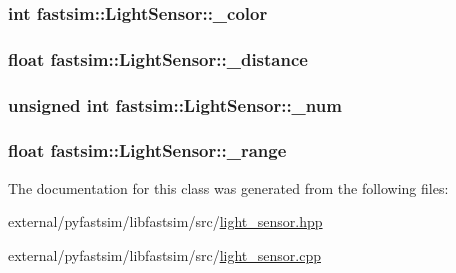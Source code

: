 \subsubsection[{\texorpdfstring{\+\_\+color}{_color}}]{\setlength{\rightskip}{0pt plus 5cm}int fastsim\+::\+Light\+Sensor\+::\+\_\+color\hspace{0.3cm}{\ttfamily [protected]}}\hypertarget{classfastsim_1_1_light_sensor_a25bf9d5e09196f8f7bcbc5069227c794}{}\label{classfastsim_1_1_light_sensor_a25bf9d5e09196f8f7bcbc5069227c794}
\subsubsection[{\texorpdfstring{\+\_\+distance}{_distance}}]{\setlength{\rightskip}{0pt plus 5cm}float fastsim\+::\+Light\+Sensor\+::\+\_\+distance\hspace{0.3cm}{\ttfamily [protected]}}\hypertarget{classfastsim_1_1_light_sensor_a620752a7c31d64be5b8890015411c9ba}{}\label{classfastsim_1_1_light_sensor_a620752a7c31d64be5b8890015411c9ba}
\subsubsection[{\texorpdfstring{\+\_\+num}{_num}}]{\setlength{\rightskip}{0pt plus 5cm}unsigned int fastsim\+::\+Light\+Sensor\+::\+\_\+num\hspace{0.3cm}{\ttfamily [protected]}}\hypertarget{classfastsim_1_1_light_sensor_a5bc0eb8041ebecc0834202d1472bc078}{}\label{classfastsim_1_1_light_sensor_a5bc0eb8041ebecc0834202d1472bc078}
\subsubsection[{\texorpdfstring{\+\_\+range}{_range}}]{\setlength{\rightskip}{0pt plus 5cm}float fastsim\+::\+Light\+Sensor\+::\+\_\+range\hspace{0.3cm}{\ttfamily [protected]}}\hypertarget{classfastsim_1_1_light_sensor_aaf45fbb76a0604bf6f982795d6a48286}{}\label{classfastsim_1_1_light_sensor_aaf45fbb76a0604bf6f982795d6a48286}


The documentation for this class was generated from the following files\+:\begin{DoxyCompactItemize}
\item 
external/pyfastsim/libfastsim/src/\hyperlink{light__sensor_8hpp}{light\+\_\+sensor.\+hpp}\item 
external/pyfastsim/libfastsim/src/\hyperlink{light__sensor_8cpp}{light\+\_\+sensor.\+cpp}\end{DoxyCompactItemize}
